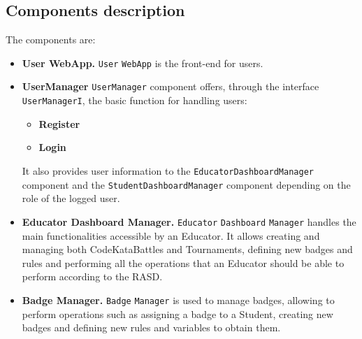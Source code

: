 \subsection{Components description}
\label{subsec:components_description}%
The components are:
\begin{itemize}
    \item \textbf{User WebApp.} \verb|User| \verb|WebApp| is the front-end for users. 
    \item \textbf{UserManager} \verb|UserManager| component offers, through the interface \verb|UserManagerI|, the basic function for handling users:
        \begin{itemize}
            \item \textbf{Register}
            \item \textbf{Login}
        \end{itemize}
        It also provides user information to the \verb|EducatorDashboardManager| component and the \verb|StudentDashboardManager| component depending on the role of the logged user.
    \item \textbf{Educator Dashboard Manager.} \verb|Educator| \verb|Dashboard| \verb|Manager| handles the main functionalities accessible by an Educator. 
    It allows creating and managing both CodeKataBattles and Tournaments, defining new badges and rules and performing all the operations that an Educator should be able to perform according to the RASD.
    \item \textbf{Badge Manager.} \verb|Badge| \verb|Manager| is used to manage badges, allowing to perform operations such as assigning a badge to a Student, creating new badges and defining new rules and variables to obtain them.

\end{itemize}

